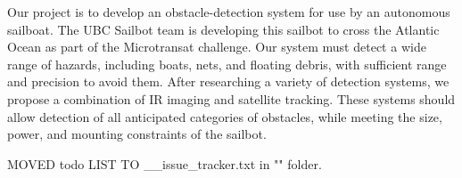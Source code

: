Our project is to develop an obstacle-detection system for use by an autonomous sailboat.  The UBC Sailbot team is developing this sailbot to cross the Atlantic Ocean as part of the Microtransat challenge.  Our system must detect a wide range of hazards, including boats, nets, and floating debris, with sufficient range and precision to avoid them.  After researching a variety of detection systems, we propose a combination of IR imaging and satellite tracking.  These systems should allow detection of all anticipated categories of obstacles, while meeting the size, power, and mounting constraints of the sailbot.

MOVED todo LIST TO __issue_tracker.txt in "\tex" folder.
